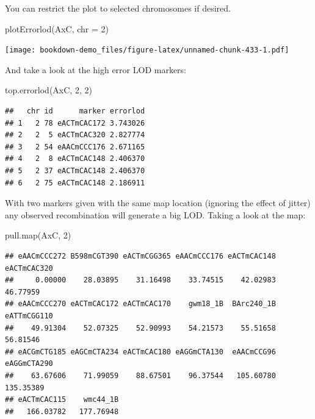\documentclass[
]{book}
\newenvironment{Shaded}{\begin{snugshade}}{\end{snugshade}}
\newcommand{\AttributeTok}[1]{\textcolor[rgb]{0.77,0.63,0.00}{#1}}
\newcommand{\DecValTok}[1]{\textcolor[rgb]{0.00,0.00,0.81}{#1}}
\newcommand{\FunctionTok}[1]{\textcolor[rgb]{0.00,0.00,0.00}{#1}}
\newcommand{\NormalTok}[1]{#1}
\begin{document}
You can restrict the plot to selected chromosomes if desired.

\begin{Shaded}
\begin{Highlighting}[]
\FunctionTok{plotErrorlod}\NormalTok{(AxC, }\AttributeTok{chr =} \DecValTok{2}\NormalTok{)}
\end{Highlighting}
\end{Shaded}

\texttt{[image: bookdown-demo\_files/figure-latex/unnamed-chunk-433-1.pdf]}

And take a look at the high error LOD markers:

\begin{Shaded}
\begin{Highlighting}[]
\FunctionTok{top.errorlod}\NormalTok{(AxC, }\DecValTok{2}\NormalTok{, }\DecValTok{2}\NormalTok{)}
\end{Highlighting}
\end{Shaded}

\begin{verbatim}
##   chr id      marker errorlod
## 1   2 78 eACTmCAC172 3.743026
## 2   2  5 eACTmCAC320 2.827774
## 3   2 54 eAACmCCC176 2.671165
## 4   2  8 eACTmCAC148 2.406370
## 5   2 37 eACTmCAC148 2.406370
## 6   2 75 eACTmCAC148 2.186911
\end{verbatim}

With two markers given with the same map location (ignoring the effect of jitter) any observed recombination will generate a big LOD. Taking a look at the map:

\begin{Shaded}
\begin{Highlighting}[]
\FunctionTok{pull.map}\NormalTok{(AxC, }\DecValTok{2}\NormalTok{)}
\end{Highlighting}
\end{Shaded}

\begin{verbatim}
## eAACmCCC272 B598mCGT390 eACTmCGG365 eAACmCCC176 eACTmCAC148 eACTmCAC320 
##     0.00000    28.03895    31.16498    33.74515    42.02983    46.77959 
## eAACmCCC270 eACTmCAC172 eACTmCAC170    gwm18_1B  BArc240_1B eATTmCGG110 
##    49.91304    52.07325    52.90993    54.21573    55.51658    56.81546 
## eACGmCTG185 eAGCmCTA234 eACTmCAC180 eAGGmCTA130  eAACmCCG96 eAGGmCTA290 
##    63.67606    71.99059    88.67501    96.37544   105.60780   135.35389 
## eACTmCAC115    wmc44_1B 
##   166.03782   177.76948
\end{verbatim}
\end{document}
